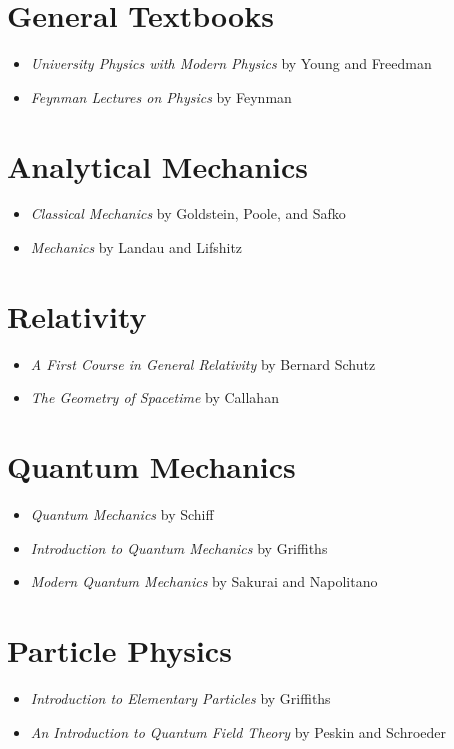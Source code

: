 \section{General Textbooks}
\begin{itemize}
  \item \emph{University Physics with Modern Physics} by Young and Freedman \cite{young-freedman}
  \item \emph{Feynman Lectures on Physics} by Feynman \cite{feynman-lectures-online}
\end{itemize}

\section{Analytical Mechanics}
\begin{itemize}
  \item \emph{Classical Mechanics} by Goldstein, Poole, and Safko \cite{goldstein-classical}
  \item \emph{Mechanics} by Landau and Lifshitz \cite{landau-mechanics}
\end{itemize}

\section{Relativity}
\begin{itemize}
  \item \emph{A First Course in General Relativity} by Bernard Schutz \cite{schutz-gr}
  \item \emph{The Geometry of Spacetime} by Callahan \cite{geometry-spacetime}
\end{itemize}

\section{Quantum Mechanics}
\begin{itemize}
  \item \emph{Quantum Mechanics} by Schiff \cite{schiff}
  \item \emph{Introduction to Quantum Mechanics} by Griffiths \cite{griffiths-qm}
  \item \emph{Modern Quantum Mechanics} by Sakurai and Napolitano \cite{jjsakurai-qm}
\end{itemize}


\section{Particle Physics}
\begin{itemize}
  \item \emph{Introduction to Elementary Particles} by Griffiths \cite{griffith-introToEP}
  \item \emph{An Introduction to Quantum Field Theory} by Peskin and Schroeder \cite{peskin-introToQFT}
\end{itemize}
